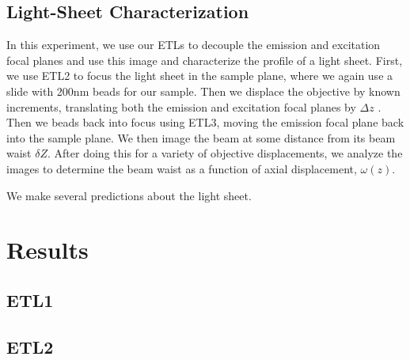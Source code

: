 \subsection{Light-Sheet Characterization}
In this experiment, we use our ETLs to decouple the emission and excitation focal planes and use this image and characterize the profile of a light sheet. First, we use ETL2 to focus the light sheet in the sample plane, where we again use a slide with 200nm beads for our sample. Then we displace the objective by known increments, translating both the emission and excitation focal planes by $\Delta z$ . Then we beads back into focus using ETL3, moving the emission focal plane back into the sample plane. We then image the beam at some distance from its beam waist $\delta Z.$ After doing this for a variety of objective displacements, we analyze the images to determine the beam waist as a function of axial displacement, $\omega(z)$. \par
We make several predictions about the light sheet.
\section{Results}
\subsection{ETL1}
\subsection{ETL2}
